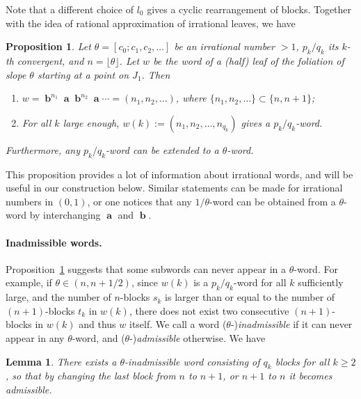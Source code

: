 \documentclass[11pt]{article} %
\theoremstyle{plain}
\newtheorem{prop}[thm]{Proposition}
\newtheorem{lm}[thm]{Lemma}
\theoremstyle{definition}
\DeclareMathOperator{\bolda}{\mathbf{a}}
\DeclareMathOperator{\boldb}{\mathbf{b}}
\numberwithin{equation}{section}
\begin{document}
Note that a different choice of $l_0$ gives a cyclic rearrangement of blocks. Together with the idea of rational approximation of irrational leaves, we have
\begin{prop}\label{prop:sturmian}
Let $\theta=[c_0;c_1,c_2,\ldots]$ be an irrational number $>1$, $p_k/q_k$ its $k$-th convergent, and $n=\lfloor\theta\rfloor$. Let $w$ be the word of a (half) leaf of the foliation of slope $\theta$ starting at a point on $J_1$. Then
\begin{enumerate}[label=\normalfont{(\arabic*)}, topsep=0mm, itemsep=0mm]
    \item $w=\boldb^{n_1}\bolda\boldb^{n_2}\bolda\cdots=(n_1,n_2,\dots)$, where $\{n_1,n_2,\ldots\}\subset\{n,n+1\}$;
    \item For all $k$ large enough, $w(k):=(n_1,n_2,\ldots,n_{q_k})$ gives a $p_k/q_k$-word.
\end{enumerate}
Furthermore, any $p_k/q_k$-word can be extended to a $\theta$-word.
\end{prop}
This proposition provides a lot of information about irrational words, and will be useful in our construction below. Similar statements can be made for irrational numbers in $(0,1)$, or one notices that any $1/\theta$-word can be obtained from a $\theta$-word by interchanging $\bolda$ and $\boldb$.

\paragraph{Inadmissible words.}
Proposition~\ref{prop:sturmian} suggests that some subwords can never appear in a $\theta$-word. For example, if $\theta\in(n,n+1/2)$, since $w(k)$ is a $p_k/q_k$-word for all $k$ sufficiently large, and the number of $n$-blocks $s_k$ is larger than or equal to the number of $(n+1)$-blocks $t_k$ in $w(k)$, there does not exist two consecutive $(n+1)$-blocks in $w(k)$ and thus $w$ itself. We call a word ($\theta$-)\emph{inadmissible} if it can never appear in any $\theta$-word, and ($\theta$-)\emph{admissible} otherwise. We have
\begin{lm}
There exists a $\theta$-inadmissible word consisting of $q_k$ blocks for all $k\ge2$, so that by changing the last block from $n$ to $n+1$, or $n+1$ to $n$ it becomes admissible.
\end{lm}
\end{document}
